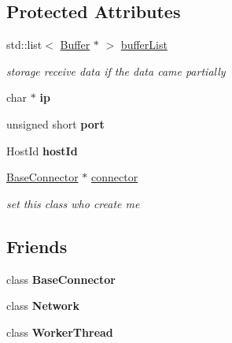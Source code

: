 \subsection*{Protected Attributes}
\begin{DoxyCompactItemize}
\item 
std\+::list$<$ \mbox{\hyperlink{class_c_g_1_1_buffer}{Buffer}} $\ast$ $>$ \mbox{\hyperlink{class_c_g_1_1_connector_info_a29bcb8d076ad5909c38bc7b91d5468ea}{buffer\+List}}
\begin{DoxyCompactList}\small\item\em storage receive data if the data came partially \end{DoxyCompactList}\item 
\mbox{\label{class_c_g_1_1_connector_info_aa15fb949f25d8fd7e69131027b98a27c}} 
char $\ast$ {\bfseries ip}
\item 
\mbox{\label{class_c_g_1_1_connector_info_a7c4139aaefc21256452638ec391db360}} 
unsigned short {\bfseries port}
\item 
\mbox{\label{class_c_g_1_1_connector_info_a216083f3e7048d7ec862edc3e428adfc}} 
Host\+Id {\bfseries host\+Id}
\item 
\mbox{\label{class_c_g_1_1_connector_info_aea7f6fc27d99ebbce648ae3b541c326c}} 
\mbox{\hyperlink{class_c_g_1_1_base_connector}{Base\+Connector}} $\ast$ \mbox{\hyperlink{class_c_g_1_1_connector_info_aea7f6fc27d99ebbce648ae3b541c326c}{connector}}
\begin{DoxyCompactList}\small\item\em set this class who create me \end{DoxyCompactList}\end{DoxyCompactItemize}
\subsection*{Friends}
\begin{DoxyCompactItemize}
\item 
\mbox{\label{class_c_g_1_1_connector_info_aaf268bd7770540a17f9c30d88b2daf19}} 
class {\bfseries Base\+Connector}
\item 
\mbox{\label{class_c_g_1_1_connector_info_a88b59289ffd793fecd040d32e397b1e9}} 
class {\bfseries Network}
\item 
\mbox{\label{class_c_g_1_1_connector_info_a5cd181bfe09cfad66e8f3d87feef1439}} 
class {\bfseries Worker\+Thread}
\end{DoxyCompactItemize}


